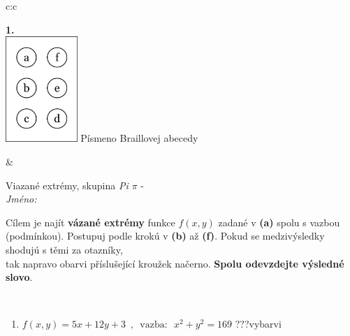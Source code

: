 \documentclass[10pt]{report}
\begin{document}
\begin{tabular}{c:c}
\begin{minipage}[c][104.5mm][t]{0.5\linewidth}
\begin{center}
\begin{minipage}{0.79\linewidth}
\begin{center}
\begin{varwidth}{\linewidth}
\begin{enumerate}
\end{enumerate}
\end{varwidth}
\end{center}
\end{minipage}
\begin{minipage}{0.20\linewidth}
\begin{center}
{\Huge\bfseries 1.} \\[2mm]
\includegraphics[height=40mm]{../images/braille.png}
{\small Písmeno Braillovej abecedy}
\end{center}
\end{minipage}
\end{center}
\end{minipage}
&
\begin{minipage}[c][104.5mm][t]{0.5\linewidth}
\begin{center}
\vspace{7mm}
{\huge Viazané extrémy, skupina \textit{Pi $\pi$} -}\\[5mm]
\textit{Jméno:}\phantom{xxxxxxxxxxxxxxxxxxxxxxxxxxxxxxxxxxxxxxxxxxxxxxxxxxxxxxxxxxxxxxxxx}\\[5mm]
\begin{minipage}{0.95\linewidth}
\begin{center}
Cílem je najít \textbf{vázané extrémy} funkce $f(x,y)$ zadané v \textbf{(a)} spolu s vazbou (podmínkou). Postupuj podle krokú v \textbf{(b)} až \textbf{(f)}. Pokud se medzivýsledky shodujú s těmi za otazníky,\\tak napravo obarvi příslušející kroužek načerno. \textbf{Spolu odevzdejte výsledné slovo}.
\end{center}
\end{minipage}
\\[1mm]
\begin{minipage}{0.79\linewidth}
\begin{center}
\begin{varwidth}{\linewidth}
\begin{enumerate}
\normalsize
\item $f(x,y)=5x+12y+3 \enspace , \enspace \mathrm{vazba:} \enspace x^2+y^2=169$\quad \dotfill\; ???\;\dotfill \quad vybarvi

\end{enumerate}
\end{varwidth}
\end{center}
\end{minipage}
\end{center}
\end{minipage}
\end{tabular}
\end{document}
